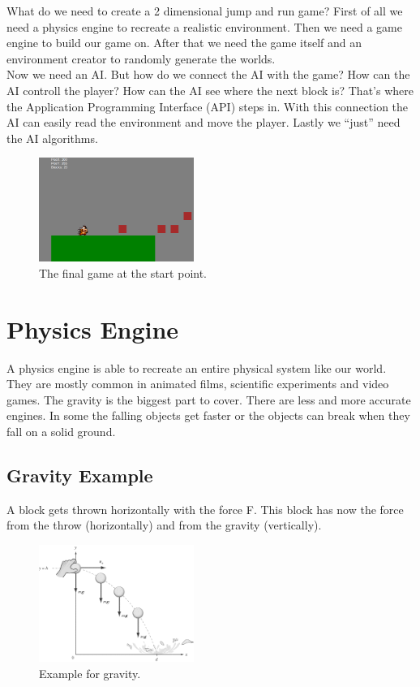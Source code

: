 What do we need to create a 2 dimensional jump and run game? First of all we need a physics engine to recreate a realistic environment. Then we need a game engine to build our game on. After that we need the game itself and an environment creator to randomly generate the worlds.\bigskip\\
Now we need an AI. But how do we connect the AI with the game? How can the AI controll the player? How can the AI see where the next block is? That's where the Application Programming Interface (API) steps in. With this connection the AI can easily read the environment and move the player. Lastly we ``just'' need the AI algorithms.

\begin{figure}[H]
  \includegraphics[width=0.45\textwidth]{images/game.png}
  \caption{The final game at the start point.}
\end{figure}
\newpage

\section{Physics Engine}
A physics engine is able to recreate an entire physical system like our world. They are mostly common in animated films, scientific experiments and video games. The gravity is the biggest part to cover. There are less and more accurate engines. In some the falling objects get faster or the objects can break when they fall on a solid ground.

\subsection{Gravity Example}
A block gets thrown horizontally with the force F. This block has now the force from the throw (horizontally) and from the gravity (vertically).\bigskip\\

\begin{figure}[H]
  \includegraphics[width=0.45\textwidth]{images/gravity_example.png}
  \caption[Gravity example from \url{http://www.sparknotes.com/testprep/books/sat2/physics/chapter7section1.rhtml}]{Example for gravity.}
\end{figure}

